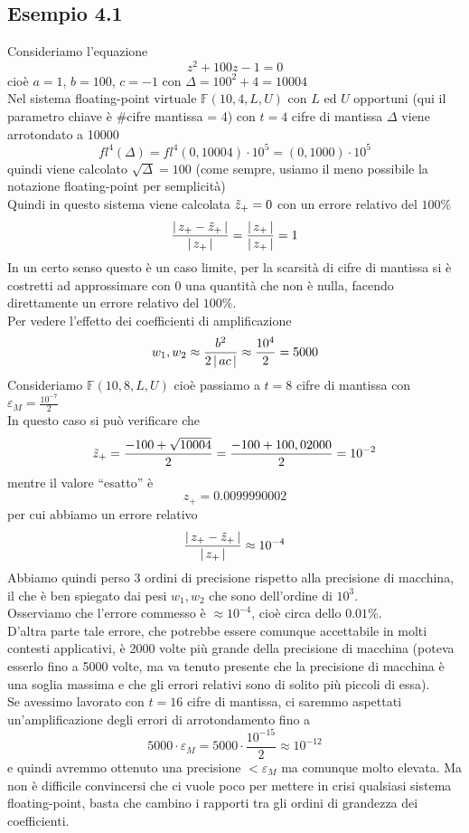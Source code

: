 \documentclass[12pt]{article}
\DeclarePairedDelimiter{\abs}{\lvert}{\rvert}
\begin{document}
\subsection{Esempio 4.1}
Consideriamo l’equazione \[z^2 + 100z -1 = 0\]
cioè $a = 1$, $b= 100$, $c =-1$ con $\Delta = 100^2+4= 10004$\\
Nel sistema floating-point virtuale $\mathbb{F}(10, 4, L, U)$ con $L$ ed $U$ opportuni (qui il parametro chiave è $\#$cifre mantissa = 4) con $t=4$ cifre di mantissa $\Delta$ viene arrotondato a 10000
\[fl^4(\Delta) = fl^4(0,10004)\cdot 10^5=(0,1000)\cdot 10^5\]
quindi viene calcolato $\sqrt{\Delta} = 100$ (come sempre, usiamo il meno possibile la notazione floating-point per semplicità)\\
Quindi in questo sistema viene calcolata $\Tilde{z}_+ = 0$ con un errore relativo del $100\%$
\[\frac{\abs{\,z_+ - \Tilde{z}_+\,}}{\abs{\,z_+\,}} = \frac{\abs{\,z_+\,}}{\abs{\,z_+\,}} = 1\]
In un certo senso questo è un caso limite, per la scarsità di cifre di mantissa si è costretti ad approssimare con 0 una quantità che non è nulla, facendo direttamente un errore relativo del $100\%$.\\
Per vedere l’effetto dei coefficienti di amplificazione
\[w_1,w_2 \approx \frac{b^2}{2\,\abs{\,ac\,}} \approx \frac{10^4}{2} = 5000\]
Consideriamo $\mathbb{F}(10,8,L,U)$ cioè passiamo a $t=8$ cifre di mantissa con $\varepsilon_M = \frac{10^{-7}}{2}$\\ 
In questo caso si può verificare che
\[ \Tilde{z}_+ = \frac{-100 + \sqrt{10004}}{2} = \frac{-100 + 100,02000}{2} = 10^{-2} \]
mentre il valore “esatto” è \[z_+= 0.0099990002\] per cui abbiamo un errore relativo
\[\frac{\abs{\,z_+ - \Tilde{z}_+\,}}{\abs{\,z_+\,}} \approx 10^{-4}\]
Abbiamo quindi perso 3 ordini di precisione rispetto alla precisione di macchina, il che è ben spiegato dai pesi $w_1, w_2$ che sono dell'ordine di $10^3$.\\ Osserviamo che l’errore commesso è $\approx 10^{-4}$, cioè circa dello $0.01\%$.\\ 
D’altra parte tale errore, che potrebbe essere comunque accettabile in molti contesti applicativi, è 2000 volte più grande della precisione di macchina (poteva esserlo fino a 5000 volte, ma va tenuto presente che la precisione di macchina è una soglia massima e che gli errori relativi sono di solito più piccoli di essa).\\
Se avessimo lavorato con $t=16$ cifre di mantissa, ci saremmo aspettati un’amplificazione degli errori di arrotondamento fino a
\[5000 \cdot\varepsilon_M = 5000 \cdot \frac{10^{-15}}{2} \approx 10^{-12}\]
e quindi avremmo ottenuto una precisione $< \varepsilon_M$ ma comunque molto elevata. Ma non è difficile convincersi che ci vuole poco per mettere in crisi qualsiasi sistema floating-point, basta che cambino i rapporti tra gli ordini di grandezza dei coefficienti.
\end{document}
